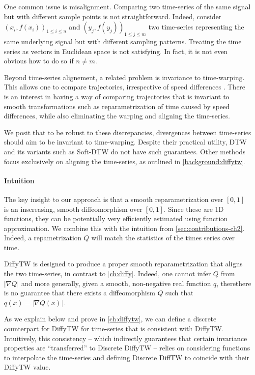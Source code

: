 One common issue is misalignment. Comparing two time-series of the same signal but with different sample points is not straightforward. Indeed, consider $(x_i, f(x_i))_{1\leq i\leq n}$ and $(y_j, f(y_j))_{1 \leq j \leq m}$ two time-series representing the same underlying signal but with different sampling patterns. Treating the time series as vectors in Euclidean space is not satisfying. In fact, it is not even obvious how to do so if $n \neq m$.

Beyond time-series alignement, a related problem is invariance to time-warping. This allows one to compare trajectories, irrespective of speed differences \citep{dtw-trajectories}. There is an interest in having a way of comparing trajectories that is invariant to smooth transformations such as reparametrization of time caused by speed differences, while also eliminating the warping and aligning the time-series.

We posit that to be robust to these discrepancies, divergences between time-series should aim to be invariant to time-warping. Despite their practical utility, DTW \citep{sakoe} and its variants such as Soft-DTW \citep{s-dtw} do not have such guarantees. Other methods focus exclusively on aligning the time-series, as outlined in \ref{background:diffytw}.

\paragraph{Intuition}
The key insight to our approach is that a smooth reparametrization over $[0,1]$ is an inscreasing, smooth diffeomorphism over $[0,1]$. Since these are 1D functions, they can be potentially very efficiently estimated using function approximation. We combine this with the intuition from \cref{sec:contributions-ch2}. Indeed, a repametrization $Q$ will match the statistics of the times series over time.

DiffyTW is designed to produce a proper smooth reparametrization that aligns the two time-series, in contrast to \cref{ch:diffy}. Indeed, one cannot infer $Q$ from $\vert \nabla Q\vert$ and more generally, given a smooth, non-negative real function $q$, therethere is no guarantee that there exists a diffeomorphism $Q$ such that $q(x) = \vert \nabla Q(x) \vert$.

As we explain below and prove in \cref{ch:diffytw}, we can define a discrete counterpart for DiffyTW for time-series that is consistent with DiffyTW. Intuitively, this consistency -- which indirectly guarantees that certain invariance properties are ``transferred'' to Discrete DiffyTW -- relies on considering functions to interpolate the time-series and defining Discrete DiffTW to coincide with their DiffyTW value.

